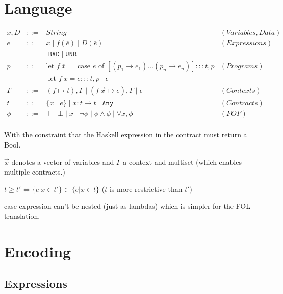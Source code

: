 \documentclass{article}
\begin{document}
\section{Language}

\newcommand{\unr}{\texttt{UNR}}
\newcommand{\unrphi}{\texttt{UNR}_\phi}
\newcommand{\bad}{\texttt{BAD}}
\newcommand{\badphi}{\texttt{BAD}_\phi}
\newcommand{\any}{\texttt{Any}}
\newcommand{\ok}{\texttt{Ok}}
\newcommand{\mand}{\mbox{ and }}
\newcommand{\motherwise}{\mbox{ otherwise.}}

\begin{eqnarray*}
  x,D &::=& String & (Variables, Data)\\
  e &::=& x \mid f(\overline{e}) \mid D(\overline{e}) & (Expressions) \\
  &&\mid \bad \mid \unr & \\
  p &::=& \mbox{let $f~\overline{x} = $ case $e$ of } [(p_1 \to e_1) \dots (p_n \to e_n)] ::: t,p   & (Programs) \\ 
  &&\mid \mbox{let } f~\overline{x} = e ::: t,p \mid \epsilon \\
  \Gamma &::=& (f \mapsto t),\Gamma \mid (f~\vec{x} \mapsto e), \Gamma \mid \epsilon & (Contexts) \\
  t &::=& \{x \mid e \} \mid x:t \to t \mid \any & (Contracts) \\
  \phi &::=& \top \mid \bot \mid x \mid \lnot \phi \mid \phi \land \phi \mid \forall x, \phi & (FOF) \\
\end{eqnarray*}

With the constraint that the Haskell expression in the contract must return a Bool.

$\vec{x}$ denotes a vector of variables and $\Gamma$ a context and multiset (which enables multiple contracts.)

$t \geq t' \iff \{ e | x \in t' \} \subset \{ e | x \in t \}$ ($t$ is more restrictive than $t'$)

case-expression can't be nested (just as lambdas) which is simpler for the FOL translation.

\section{Encoding}


\subsection{Expressions}
\end{document}
